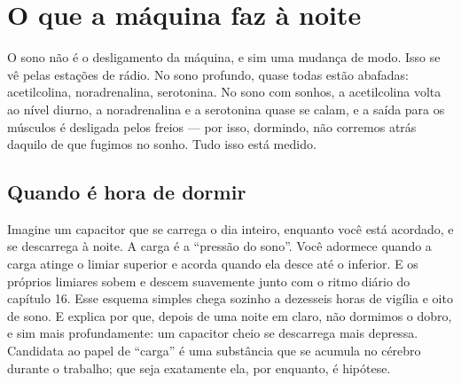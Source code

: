 \chapter{O que a máquina faz à noite}

O sono não é o desligamento da máquina, e sim uma mudança de modo. Isso se vê pelas estações de rádio. No sono profundo, quase todas estão abafadas: acetilcolina, noradrenalina, serotonina. No sono com sonhos, a acetilcolina volta ao nível diurno, a noradrenalina e a serotonina quase se calam, e a saída para os músculos é desligada pelos freios --- por isso, dormindo, não corremos atrás daquilo de que fugimos no sonho. Tudo isso está medido.

\section*{Quando é hora de dormir}

Imagine um capacitor que se carrega o dia inteiro, enquanto você está acordado, e se descarrega à noite. A carga é a ``pressão do sono''. Você adormece quando a carga atinge o limiar superior e acorda quando ela desce até o inferior. E os próprios limiares sobem e descem suavemente junto com o ritmo diário do capítulo 16. Esse esquema simples chega sozinho a dezesseis horas de vigília e oito de sono. E explica por que, depois de uma noite em claro, não dormimos o dobro, e sim mais profundamente: um capacitor cheio se descarrega mais depressa. Candidata ao papel de ``carga'' é uma substância que se acumula no cérebro durante o trabalho; que seja exatamente ela, por enquanto, é hipótese.


